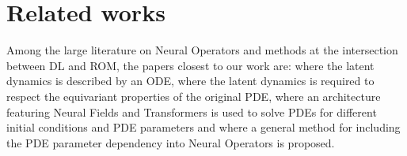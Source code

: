 \section{Related works}
Among the large literature on Neural Operators and methods at the intersection between DL and ROM, the papers closest to our work are: \cite{knigge2024space} where the latent dynamics is described by an ODE, \cite{yin2023continuous} where the latent dynamics is required to respect the equivariant properties of the original PDE, \cite{vcnef-hagnberger:2024} where an architecture featuring Neural Fields and Transformers is used to solve PDEs for different initial conditions and PDE parameters and \cite{takamoto2023learning} where a general method for including the PDE parameter dependency into Neural Operators is proposed.